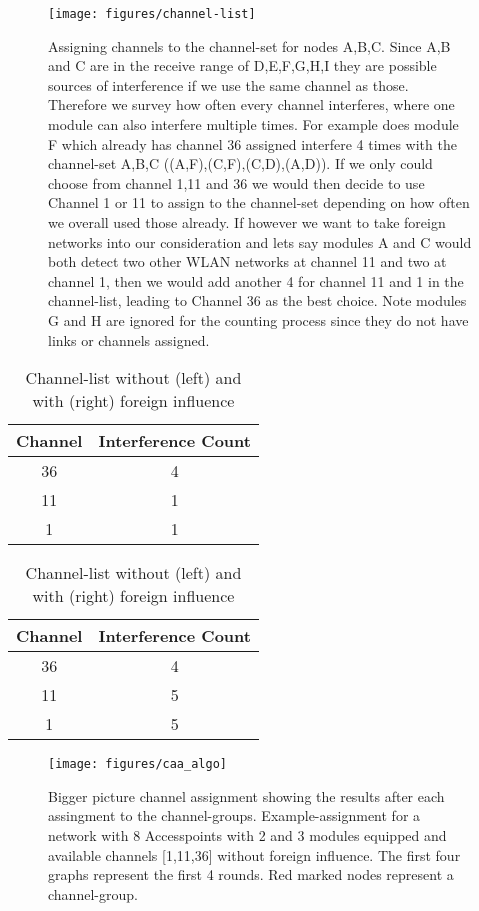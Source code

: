     \begin{figure}[h!]
      \centering
      \texttt{[image: figures/channel-list]}
      \caption{Assigning channels to the channel-set for nodes A,B,C. Since A,B and C are in the receive range of D,E,F,G,H,I they are possible sources
	of interference if we use the same channel as those. Therefore we survey how often every channel interferes, where one module can also interfere multiple times.
	For example does module F which already has channel 36 assigned interfere 4 times with the channel-set A,B,C ((A,F),(C,F),(C,D),(A,D)). If we only could choose from 
	channel 1,11 and 36 we would then decide to use Channel 1 or 11 to assign to the channel-set depending on how often we overall used those already.
	If however we want to take foreign networks into our consideration and lets say modules A and C would both detect two other \ac{WLAN} networks at channel 11 and two
	at channel 1, then we would add another 4 for channel 11 and 1 in the channel-list, leading to Channel 36 as the best choice. Note modules G and H are ignored 
	for the counting process since they do not have links or channels assigned.}
      \label{fig:channel-list}
    \end{figure}
    
    \begin{table}
      \centering
      \begin{tabular}{|c|c|}\hline
	Channel & Interference Count\\ \hline
	36 & 4 \\ \hline
	11 & 1 \\ \hline
	1 & 1 \\\hline
      \end{tabular}
      \begin{tabular}{|c|c|}\hline
	Channel & Interference Count\\ \hline
	36 & 4 \\ \hline
	11 & 5 \\ \hline
	1 & 5  \\\hline
      \end{tabular}
      \caption{Channel-list without (left) and with (right) foreign influence}
    \end{table}
  
    \begin{figure}[h!]
      \centering
      \texttt{[image: figures/caa\_algo]}
      \caption{Bigger picture channel assignment showing the results after each assingment to the channel-groups. 
	Example-assignment for a network with 8 Accesspoints with 2 and 3 modules equipped and available channels [1,11,36] without foreign influence. 
	The first four graphs represent the first 4 rounds. Red marked nodes represent a channel-group.}
      \label{fig:caa_algo}
    \end{figure}
